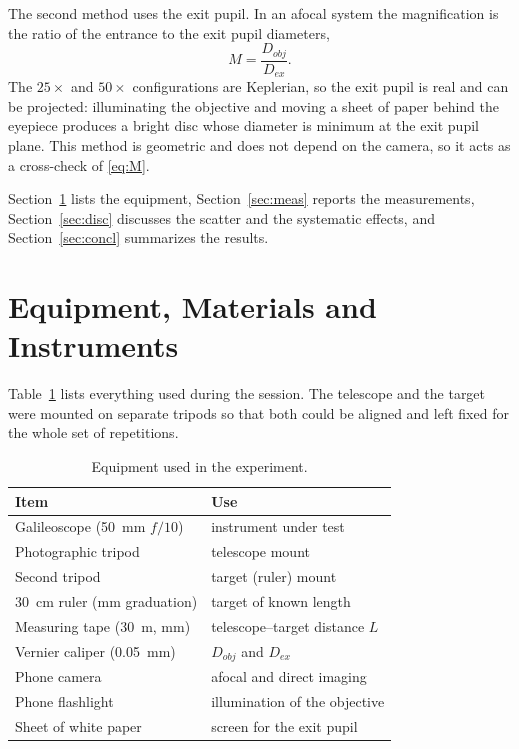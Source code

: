 \documentclass[conference]{IEEEtran}
\begin{document}
The second method uses the exit pupil. In an afocal system the magnification is
the ratio of the entrance to the exit pupil diameters,
\begin{equation}
M = \frac{D_{obj}}{D_{ex}} .
\label{eq:pupil}
\end{equation}
The $25\times$ and $50\times$ configurations are Keplerian, so the
exit pupil is real and can be projected: illuminating the objective and moving
a sheet of paper behind the eyepiece produces a bright disc whose diameter is
minimum at the exit pupil plane. This method is geometric and does not depend
on the camera, so it acts as a cross-check of \eqref{eq:M}.

Section~\ref{sec:equip} lists the equipment, Section~\ref{sec:meas} reports the
measurements, Section~\ref{sec:disc} discusses the scatter and the systematic
effects, and Section~\ref{sec:concl} summarizes the results.

\section{Equipment, Materials and Instruments}
\label{sec:equip}

Table~\ref{tab:equip} lists everything used during the session. The telescope
and the target were mounted on separate tripods so that both could be aligned
and left fixed for the whole set of repetitions.

\begin{table}[htbp]
\caption{Equipment used in the experiment.}
\label{tab:equip}
\centering
\small
\begin{tabular}{@{}ll@{}}
\toprule
\textbf{Item} & \textbf{Use} \\
\midrule
Galileoscope (\SI{50}{\milli\meter} $f/10$) & instrument under test \\
Photographic tripod & telescope mount \\
Second tripod & target (ruler) mount \\
\SI{30}{\centi\meter} ruler (mm graduation) & target of known length \\
Measuring tape (\SI{30}{\meter}, mm) & telescope--target distance $L$ \\
Vernier caliper (\SI{0.05}{\milli\meter}) & $D_{obj}$ and $D_{ex}$ \\
Phone camera & afocal and direct imaging \\
Phone flashlight & illumination of the objective \\
Sheet of white paper & screen for the exit pupil \\
\bottomrule
\end{tabular}
\end{table}
\end{document}
